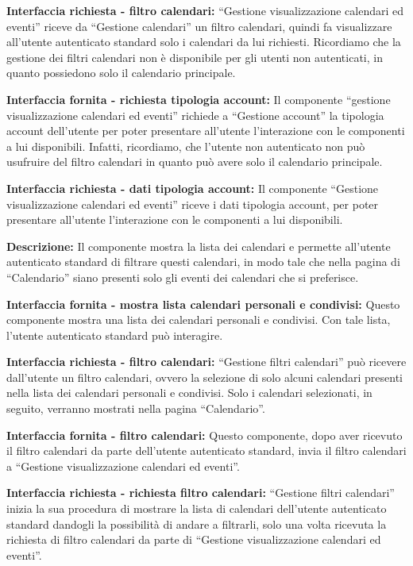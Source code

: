 \begin{listaPersonale}[DCI]{}
    \textbf{Interfaccia richiesta - filtro calendari:} “Gestione visualizzazione calendari ed eventi” riceve da “Gestione calendari” un filtro calendari, quindi fa visualizzare all'utente autenticato standard solo i calendari da lui richiesti. Ricordiamo che la gestione dei filtri calendari non è disponibile per gli utenti non autenticati, in quanto possiedono solo il calendario principale.

    \textbf{Interfaccia fornita - richiesta tipologia account:} Il componente “gestione visualizzazione calendari ed eventi” richiede a “Gestione account”  la tipologia account dell'utente per poter presentare all'utente l'interazione con le componenti a lui disponibili. Infatti, ricordiamo, che l'utente non autenticato non può usufruire del filtro calendari in quanto può avere solo il calendario principale.

    \textbf{Interfaccia richiesta - dati tipologia account:} Il componente “Gestione visualizzazione calendari ed eventi” riceve i dati tipologia account, per poter presentare all'utente l'interazione con le componenti a lui disponibili.



    \textbf{Descrizione:} Il componente mostra la lista dei calendari e permette all'utente autenticato standard di filtrare questi calendari, in modo tale che nella pagina di “Calendario” siano presenti solo gli eventi dei calendari che si preferisce.

    \textbf{Interfaccia fornita - mostra lista calendari personali e condivisi:} Questo componente mostra una lista dei calendari personali e condivisi. Con tale lista, l'utente autenticato standard può interagire.

    \textbf{Interfaccia richiesta - filtro calendari:} “Gestione filtri calendari” può ricevere dall'utente un filtro calendari, ovvero la selezione di solo alcuni calendari presenti nella lista dei calendari personali e condivisi. Solo i calendari selezionati, in seguito, verranno mostrati nella pagina “Calendario”.

    \textbf{Interfaccia fornita - filtro calendari:} Questo componente, dopo aver ricevuto il filtro calendari da parte dell'utente autenticato standard, invia il filtro calendari a “Gestione visualizzazione calendari ed eventi”.


    \textbf{Interfaccia richiesta - richiesta filtro calendari:} “Gestione filtri calendari” inizia la sua procedura di mostrare la lista di calendari dell'utente autenticato standard dandogli la possibilità di andare a filtrarli, solo una volta ricevuta la richiesta di filtro calendari da parte di “Gestione visualizzazione calendari ed eventi”.



\end{listaPersonale}
